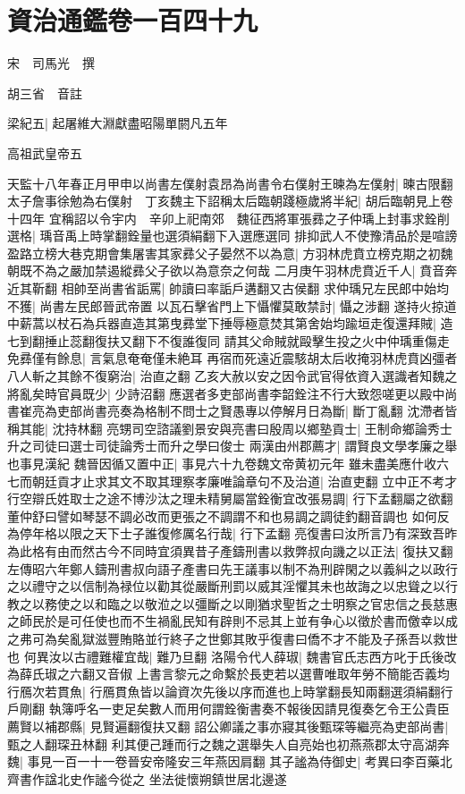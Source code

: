 \section{資治通鑑卷一百四十九}
宋　司馬光　撰

胡三省　音註

梁紀五|{
	起屠維大淵獻盡昭陽單閼凡五年}


高祖武皇帝五

天監十八年春正月甲申以尚書左僕射袁昂為尚書令右僕射王暕為左僕射|{
	暕古限翻}
太子詹事徐勉為右僕射　丁亥魏主下詔稱太后臨朝踐極歲將半紀|{
	胡后臨朝見上卷十四年}
宜稱詔以令宇内　辛卯上祀南郊　魏征西將軍張彞之子仲瑀上封事求銓削選格|{
	瑀音禹上時掌翻銓量也選須絹翻下入選應選同}
排抑武人不使豫清品於是喧謗盈路立榜大巷克期會集屠害其家彞父子晏然不以為意|{
	方羽林虎賁立榜克期之初魏朝既不為之嚴加禁遏縱彞父子欲以為意奈之何哉}
二月庚午羽林虎賁近千人|{
	賁音奔近其靳翻}
相帥至尚書省詬罵|{
	帥讀曰率詬戶遘翻又古侯翻}
求仲瑀兄左民郎中始均不獲|{
	尚書左民郎晉武帝置}
以瓦石擊省門上下懾懼莫敢禁討|{
	懾之涉翻}
遂持火掠道中薪蒿以杖石為兵器直造其第曳彞堂下捶辱極意焚其第舍始均踰垣走復還拜賊|{
	造七到翻捶止蕊翻復扶又翻下不復誰復同}
請其父命賊就毆擊生投之火中仲瑀重傷走免彞僅有餘息|{
	言氣息奄奄僅未絶耳}
再宿而死遠近震駭胡太后收掩羽林虎賁凶彊者八人斬之其餘不復窮治|{
	治直之翻}
乙亥大赦以安之因令武官得依資入選識者知魏之將亂矣時官員既少|{
	少詩沼翻}
應選者多吏部尚書李韶銓注不行大致怨嗟更以殿中尚書崔亮為吏部尚書亮奏為格制不問士之賢愚專以停解月日為斷|{
	斷丁亂翻}
沈滯者皆稱其能|{
	沈持林翻}
亮甥司空諮議劉景安與亮書曰殷周以鄉塾貢士|{
	王制命鄉論秀士升之司徒曰選士司徒論秀士而升之學曰俊士}
兩漢由州郡薦才|{
	謂賢良文學孝廉之舉也事見漢紀}
魏晉因循又置中正|{
	事見六十九卷魏文帝黄初元年}
雖未盡美應什收六七而朝廷貢才止求其文不取其理察孝廉唯論章句不及治道|{
	治直吏翻}
立中正不考才行空辯氏姓取士之途不博沙汰之理未精舅屬當銓衡宜改張易調|{
	行下孟翻屬之欲翻董仲舒曰譬如琴瑟不調必改而更張之不調謂不和也易調之調徒釣翻音調也}
如何反為停年格以限之天下士子誰復修厲名行哉|{
	行下孟翻}
亮復書曰汝所言乃有深致吾昨為此格有由而然古今不同時宜須異昔子產鑄刑書以救弊叔向譏之以正法|{
	復扶又翻左傳昭六年鄭人鑄刑書叔向語子產書曰先王議事以制不為刑辟閑之以義糾之以政行之以禮守之以信制為禄位以勸其從嚴斷刑罰以威其淫懼其未也故誨之以忠聳之以行教之以務使之以和臨之以敬涖之以彊斷之以剛猶求聖哲之士明察之官忠信之長慈惠之師民於是可任使也而不生禍亂民知有辟則不忌其上並有争心以徵於書而儌幸以成之弗可為矣亂獄滋豐賄賂並行終子之世鄭其敗乎復書曰僑不才不能及子孫吾以救世也}
何異汝以古禮難權宜哉|{
	難乃旦翻}
洛陽令代人薛琡|{
	魏書官氏志西方叱于氏後改為薛氏琡之六翻又音俶}
上書言黎元之命繫於長吏若以選曹唯取年勞不簡能否義均行鴈次若貫魚|{
	行鴈貫魚皆以論資次先後以序而進也上時掌翻長知兩翻選須絹翻行戶剛翻}
執簿呼名一吏足矣數人而用何謂銓衡書奏不報後因請見復奏乞令王公貴臣薦賢以補郡縣|{
	見賢遍翻復扶又翻}
詔公卿議之事亦寢其後甄琛等繼亮為吏部尚書|{
	甄之人翻琛丑林翻}
利其便己踵而行之魏之選舉失人自亮始也初燕燕郡太守高湖奔魏|{
	事見一百一十一卷晉安帝隆安三年燕因肩翻}
其子謐為侍御史|{
	考異曰李百藥北齊書作諡北史作謐今從之}
坐法徙懷朔鎮世居北邊遂

